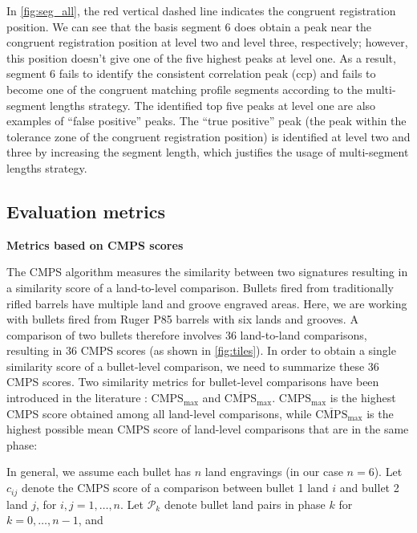 In \autoref{fig:seg_all}, the red vertical dashed line indicates the
congruent registration position. We can see that the basis segment 6
does obtain a peak near the congruent registration position at level two
and level three, respectively; however, this position doesn't give one
of the five highest peaks at level one. As a result, segment 6 fails to
identify the consistent correlation peak (ccp) and fails to become one
of the congruent matching profile segments according to the
multi-segment lengths strategy. The identified top five peaks at level
one are also examples of ``false positive'' peaks. The ``true positive''
peak (the peak within the tolerance zone of the congruent registration
position) is identified at level two and three by increasing the segment
length, which justifies the usage of multi-segment lengths strategy.

\hypertarget{evaluation-metrics}{%
\subsection{Evaluation metrics}\label{evaluation-metrics}}

\textbf{Metrics based on CMPS scores}

The CMPS algorithm measures the similarity between two signatures
resulting in a similarity score of a land-to-level comparison. Bullets
fired from traditionally rifled barrels have multiple land and groove
engraved areas. Here, we are working with bullets fired from Ruger P85
barrels with six lands and grooves. A comparison of two bullets
therefore involves 36 land-to-land comparisons, resulting in 36 CMPS
scores (as shown in \autoref{fig:tiles}). In order to obtain a single
similarity score of a bullet-level comparison, we need to summarize
these 36 CMPS scores. Two similarity metrics for bullet-level
comparisons have been introduced in the literature \citep{cmps}:
\(\mathrm{CMPS_{max}}\) and \(\mathrm{\overline{CMPS}_{max}}\).
\(\mathrm{CMPS_{max}}\) is the highest CMPS score obtained among all
land-level comparisons, while \(\mathrm{\overline{CMPS}_{max}}\) is the
highest possible mean CMPS score of land-level comparisons that are in
the same phase:

In general, we assume each bullet has \(n\) land engravings (in our case
\(n=6\)). Let \(c_{ij}\) denote the CMPS score of a comparison between
bullet 1 land \(i\) and bullet 2 land \(j\), for \(i,j = 1, \dots, n\).
Let \(\mathcal{P}_k\) denote bullet land pairs in phase \(k\) for
\(k = 0, \dots, n-1\), and

